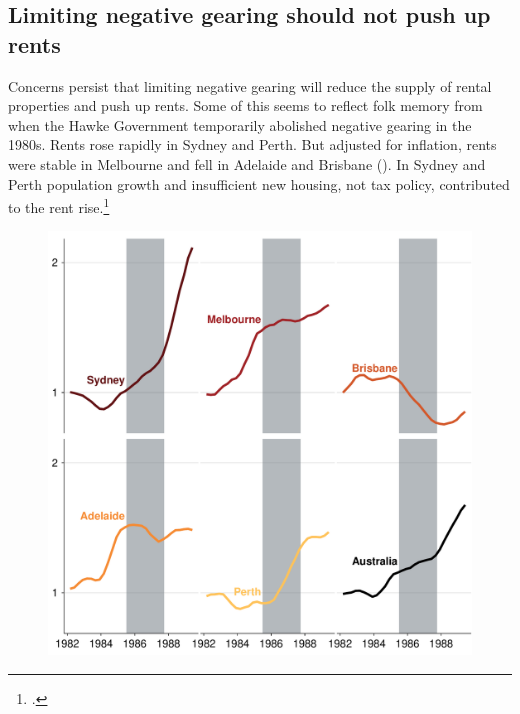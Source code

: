 \documentclass{grattan}\usepackage[]{graphicx}\usepackage[]{color}
\begin{document}
\subsection{Limiting negative gearing should not push up rents}
Concerns persist that limiting negative gearing will reduce the supply of rental properties and push up rents. Some of this seems to reflect folk memory from when the Hawke Government temporarily abolished negative gearing in the 1980s. Rents rose rapidly in Sydney and Perth. But adjusted for inflation, rents were stable in Melbourne and fell in Adelaide and Brisbane (). In Sydney and Perth population growth and insufficient new housing, not tax policy, contributed to the rent rise.\footcite[pp.~47-48]{Daley2013}




\begin{figure}
\includegraphics[width=\columnwidth]{figure/Capital_city_rents-1}
\end{figure}
\end{document}
